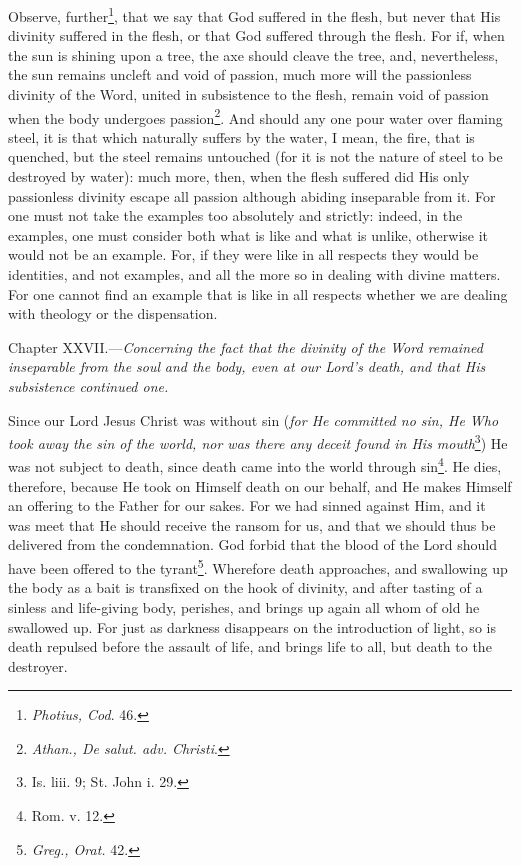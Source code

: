 Observe, further\footnote{\emph{Photius, Cod}. 46.}, that we say that God suffered in the flesh, but never that His divinity suffered in the flesh, or that God suffered through the flesh. For if, when the sun is shining upon a tree, the axe should cleave the tree, and, nevertheless, the sun remains uncleft and void of passion, much more will the passionless divinity of the Word, united in subsistence to the flesh, remain void of passion when the body undergoes passion\footnote{\emph{Athan., De salut. adv. Christi}.}. And should any one pour water over flaming steel, it is that which naturally suffers by the water, I mean, the fire, that is quenched, but the steel remains untouched (for it is not the nature of steel to be destroyed by water): much more, then, when the flesh suffered did His only passionless divinity escape all passion although abiding inseparable from it. For one must not take the examples too absolutely and strictly: indeed, in the examples, one must consider both what is like and what is unlike, otherwise it would not be an example. For, if they were like in all respects they would be identities, and not examples, and all the more so in dealing with divine matters. For one cannot find an example that is like in all respects whether we are dealing with theology or the dispensation.


Chapter XXVII.—\emph{Concerning the fact that the divinity of the Word remained inseparable from the soul} \emph{and the body, even at our Lord’s death, and that His subsistence continued one.}

Since our Lord Jesus Christ was without sin (\emph{for He committed no sin, He Who took away the sin of the world, nor was there any deceit found in His mouth}\footnote{Is. liii. 9; St. John i. 29.}) He was not subject to death, since death came into the world through sin\footnote{Rom. v. 12.}. He dies, therefore, because He took on Himself death on our behalf, and He makes Himself an offering to the Father for our sakes. For we had sinned against Him, and it was meet that He should receive the ransom for us, and that we should thus be delivered from the condemnation. God forbid that the blood of the Lord should have been offered to the tyrant\footnote{\emph{Greg., Orat. }42.}. Wherefore death approaches, and swallowing up the body as a bait is transfixed on the hook of divinity, and after tasting of a sinless and life-giving body, perishes, and brings up again all whom of old he swallowed up. For just as darkness disappears on the introduction of light, so is death repulsed before the assault of life, and brings life to all, but death to the destroyer.

